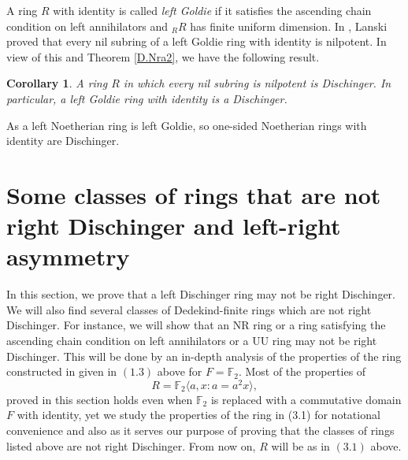 \documentclass[12pt]{article}
\theoremstyle{plain}
\newtheorem{cor}[thm]{Corollary}
\theoremstyle{definition}
\begin{document}
	A ring $R$ with identity is called {\em left Goldie} if it satisfies the ascending chain condition on left annihilators and $_RR$ has finite uniform dimension. In \cite{Lanski}, Lanski proved that every nil subring of a left Goldie ring with identity is nilpotent. In view of this and Theorem \ref{D.Nra2}, we have the following result. 
	\begin{cor}\label{D.goldie}
		A ring $R$ in which every nil subring is nilpotent is Dischinger. In particular, a left Goldie ring with identity is a Dischinger.
	\end{cor}
	As a left Noetherian ring is left Goldie, so one-sided Noetherian rings with identity are Dischinger.
	
	
	\section{Some classes of rings that are not right Dischinger and left-right asymmetry}
	
	In this section,  we prove that a left Dischinger ring may not be right Dischinger. We will also find several classes of Dedekind-finite rings which are not right Dischinger. For instance, we will show that an NR ring or a ring satisfying the ascending chain condition on left annihilators or a UU ring may not be right Dischinger. This will be done by an in-depth analysis of the properties of the ring constructed in \cite{Dit} given in $(1.3)$ above for $F = \mathbb{F}_2$. Most of the properties of 
	\begin{equation} R = \mathbb{F}_2\langle a,x :  a= a^2x\rangle, \tag{3.1} \end{equation} 
	proved in this section holds even when $\mathbb{F}_2$ is replaced with a commutative domain $F$ with identity, yet we study the properties of the ring in (3.1) for notational convenience and also as it serves our purpose of proving that the classes of rings listed above are not right Dischinger. From now on, $R$ will be as in $(3.1)$ above.
	
\end{document}
